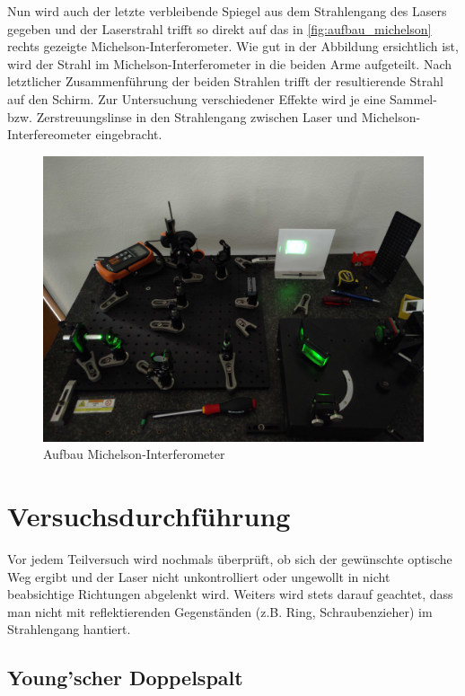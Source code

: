 \documentclass[ngerman]{scrartcl}
\begin{document}
Nun wird auch der letzte verbleibende Spiegel aus dem Strahlengang des Lasers gegeben und der Laserstrahl trifft so direkt auf das in \autoref{fig:aufbau_michelson} rechts gezeigte Michelson-Interferometer. Wie gut in der Abbildung ersichtlich ist, wird der Strahl im Michelson-Interferometer in die beiden Arme aufgeteilt. Nach letztlicher Zusammenführung der beiden Strahlen trifft der resultierende Strahl auf den Schirm.
Zur Untersuchung verschiedener Effekte wird je eine Sammel- bzw. Zerstreuungslinse in den Strahlengang zwischen Laser und Michelson-Interfereometer eingebracht.
%
\begin{figure}[H]
    \centering
    \begin{samepage}
        \includegraphics[width=0.7\linewidth]{fig/Compressed/aufbau_michelson.jpg}
        \caption{Aufbau Michelson-Interferometer}
        \label{fig:aufbau_michelson}
    \end{samepage}
\end{figure}



\section{Versuchsdurchführung}
\label{sec:durchfuehrung}

Vor jedem Teilversuch wird nochmals überprüft, ob sich der gewünschte optische Weg ergibt und der Laser nicht unkontrolliert oder ungewollt in nicht beabsichtige Richtungen abgelenkt wird. Weiters wird stets darauf geachtet, dass man nicht mit reflektierenden Gegenständen (z.B. Ring, Schraubenzieher) im Strahlengang hantiert.

\subsection{Young'scher Doppelspalt}
\label{sec:durchfuehrung_doppelspalt}
\end{document}
